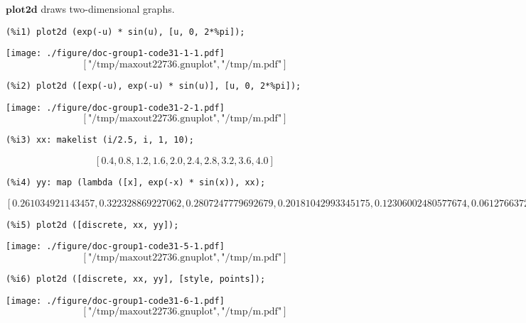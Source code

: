 \documentclass[12pt,leqno]{article}
\begin{document}
$\mathbf{plot2d}$ draws two-dimensional graphs.
\begin{verbatim}
(%i1) plot2d (exp(-u) * sin(u), [u, 0, 2*%pi]);
\end{verbatim}
\texttt{[image: ./figure/doc-group1-code31-1-1.pdf]}
\begin{dmath}[number={\(\mathop{\mathrm{\%o}_{1}}\)}]
\left[\mbox{"/tmp/maxout22736.gnuplot"}, \mbox{"/tmp/m.pdf"}\right]
\end{dmath}
\begin{verbatim}
(%i2) plot2d ([exp(-u), exp(-u) * sin(u)], [u, 0, 2*%pi]);
\end{verbatim}
\texttt{[image: ./figure/doc-group1-code31-2-1.pdf]}
\begin{dmath}[number={\(\mathop{\mathrm{\%o}_{2}}\)}]
\left[\mbox{"/tmp/maxout22736.gnuplot"}, \mbox{"/tmp/m.pdf"}\right]
\end{dmath}
\begin{verbatim}
(%i3) xx: makelist (i/2.5, i, 1, 10);
\end{verbatim}
\begin{dmath}[number={\(\mathop{\mathrm{\%o}_{3}}\)}]
\left[0.4, 0.8, 1.2, 1.6, 2.0, 2.4, 2.8, 3.2, 3.6, 4.0\right]
\end{dmath}
\begin{verbatim}
(%i4) yy: map (lambda ([x], exp(-x) * sin(x)), xx);
\end{verbatim}
\begin{dmath}[number={\(\mathop{\mathrm{\%o}_{4}}\)}]
\left[0.261034921143457, 0.322328869227062, 0.2807247779692679, 0.20181042993345175, 0.12306002480577674, 0.06127663726195732, 0.020370650389686513, -0.0023794587414574246, -0.012091305769841415, -0.013861321214152955\right]
\end{dmath}
\begin{verbatim}
(%i5) plot2d ([discrete, xx, yy]);
\end{verbatim}
\texttt{[image: ./figure/doc-group1-code31-5-1.pdf]}
\begin{dmath}[number={\(\mathop{\mathrm{\%o}_{5}}\)}]
\left[\mbox{"/tmp/maxout22736.gnuplot"}, \mbox{"/tmp/m.pdf"}\right]
\end{dmath}
\begin{verbatim}
(%i6) plot2d ([discrete, xx, yy], [style, points]);
\end{verbatim}
\texttt{[image: ./figure/doc-group1-code31-6-1.pdf]}
\begin{dmath}[number={\(\mathop{\mathrm{\%o}_{6}}\)}]
\left[\mbox{"/tmp/maxout22736.gnuplot"}, \mbox{"/tmp/m.pdf"}\right]
\end{dmath}
\end{document}
